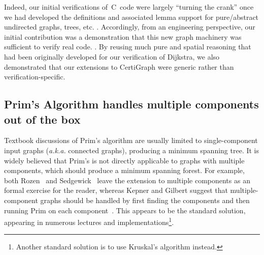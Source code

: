 Indeed, our initial verifications of~C~code were largely ``turning the crank'' once we had developed the definitions and associated lemma support for pure/abstract undirected graphs, trees, etc. .  Accordingly, from an engineering perspective, our initial contribution was a demonstration that this new graph machinery was sufficient to verify real code.  .  By reusing much pure and spatial reasoning that had been originally developed for our verification of Dijkstra, we also demonstrated that our extensions to CertiGraph  were generic rather than verification-specific.

\subsection{Prim's Algorithm handles multiple components out of the box}
\label{sec:primforest}

Textbook discussions of Prim's algorithm are usually limited to single-component input graphs (\emph{a.k.a.} connected graphs), producing a minimum spanning tree.  It is widely believed that Prim's is not directly applicable to graphs with multiple components, which should produce a minimum spanning forest.  For example, both Rozen~\cite{rozen} and Sedgewick~\cite{sedgewick} leave the extension to multiple components as an formal exercise for the reader, whereas Kepner and Gilbert suggest that multiple-component graphs should be handled by first finding the components and then running Prim on each component~\cite{kepnergilbert}.  This appears to be the standard solution, appearing in numerous lectures and implementations\footnote{Another standard solution is to use Kruskal's  algorithm instead.}. %

